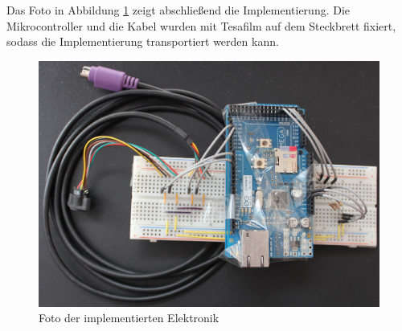 Das Foto in Abbildung \ref{foto1} zeigt abschließend die Implementierung. Die Mikrocontroller und die Kabel wurden mit Tesafilm auf dem Steckbrett fixiert, sodass die Implementierung transportiert werden kann.
\begin{figure}
  \centering
  \includegraphics[width=1\textwidth]{images/foto1.jpg}
  \caption{Foto der implementierten Elektronik}
  \label{foto1}
\end{figure}